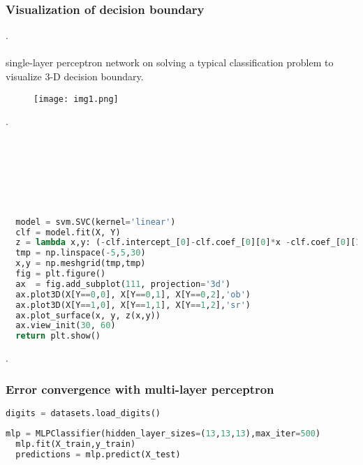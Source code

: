 \documentclass[onecolumn]{article}
\begin{document}
\subsubsection{Visualization of decision boundary}
\label{sec:2}

 .\\\\
 single-layer perceptron network on
solving a typical classification problem to visualize 3-D decision boundary.\\

 \begin{figure}[ht!]
\centering
\texttt{[image: img1.png]}
\end{figure}
.\\\\\\\\\\\\
\begin{lstlisting}[language=Python, caption= Visualization] 
 
  model = svm.SVC(kernel='linear')
  clf = model.fit(X, Y)
  z = lambda x,y: (-clf.intercept_[0]-clf.coef_[0][0]*x -clf.coef_[0][1]*y) /   clf.coef_[0][2]
  tmp = np.linspace(-5,5,30)
  x,y = np.meshgrid(tmp,tmp)
  fig = plt.figure()
  ax  = fig.add_subplot(111, projection='3d')
  ax.plot3D(X[Y==0,0], X[Y==0,1], X[Y==0,2],'ob')
  ax.plot3D(X[Y==1,0], X[Y==1,1], X[Y==1,2],'sr')
  ax.plot_surface(x, y, z(x,y))
  ax.view_init(30, 60)
  return plt.show()
\end{lstlisting} 
.\\
\subsubsection{Error convergence with multi-layer perceptron}
\label{sec:2}

\begin{lstlisting}[language=Python, caption= digits] 
  digits = datasets.load_digits()
\end{lstlisting} 

\begin{lstlisting}[language=Python, caption= MLPClassifier] 
  mlp = MLPClassifier(hidden_layer_sizes=(13,13,13),max_iter=500)
  mlp.fit(X_train,y_train)
  predictions = mlp.predict(X_test)
\end{lstlisting} 

\nocite{*}


\end{document}
